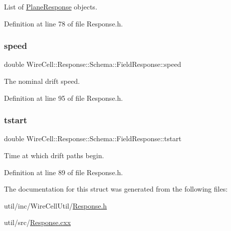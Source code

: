 List of \hyperlink{struct_wire_cell_1_1_response_1_1_schema_1_1_plane_response}{Plane\+Response} objects. 



Definition at line 78 of file Response.\+h.

\mbox{\label{struct_wire_cell_1_1_response_1_1_schema_1_1_field_response_af7e1b2ede3d1a533db44af94a9cb95d0}} 
\subsubsection{\texorpdfstring{speed}{speed}}
{\footnotesize\ttfamily double Wire\+Cell\+::\+Response\+::\+Schema\+::\+Field\+Response\+::speed}



The nominal drift speed. 



Definition at line 95 of file Response.\+h.

\mbox{\label{struct_wire_cell_1_1_response_1_1_schema_1_1_field_response_ad635ad2311a574c52bf1d4f6375909d5}} 
\subsubsection{\texorpdfstring{tstart}{tstart}}
{\footnotesize\ttfamily double Wire\+Cell\+::\+Response\+::\+Schema\+::\+Field\+Response\+::tstart}



Time at which drift paths begin. 



Definition at line 89 of file Response.\+h.



The documentation for this struct was generated from the following files\+:\begin{DoxyCompactItemize}
\item 
util/inc/\+Wire\+Cell\+Util/\hyperlink{_response_8h}{Response.\+h}\item 
util/src/\hyperlink{_response_8cxx}{Response.\+cxx}\end{DoxyCompactItemize}
